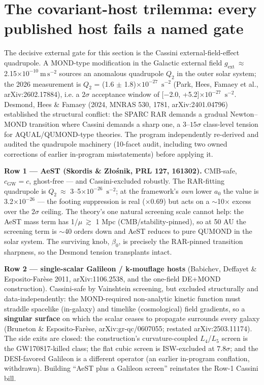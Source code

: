 \documentclass[11pt,a4paper]{article}
\begin{document}
\section{The covariant-host trilemma: every published host fails a named gate}

The decisive external gate for this section is the Cassini external-field-effect quadrupole. A MOND-type modification in the Galactic external field $g_{\mathrm{ext}}\ \approx$ 2.15$\times10^{-10}\ \mathrm{m\,s^{-2}}$ sources an anomalous quadrupole $Q_2$ in the outer solar system; the 2026 measurement is $Q_2$ = (1.6 $\pm$ 1.8)$\times10^{-27}$\ $\mathrm{s^{-2}}$ (Park, Hees, Famaey et al., arXiv:2602.17884), i.e. a $2\sigma$ acceptance window of [$-$2.0, +5.2]$\times10^{-27}$\ $\mathrm{s^{-2}}$. Desmond, Hees \& Famaey (2024, MNRAS 530, 1781, arXiv:2401.04796) established the structural conflict: the SPARC RAR demands a gradual Newton--MOND transition where Cassini demands a sharp one, a $3$--$15\sigma$ class-level tension for AQUAL/QUMOND-type theories. The program independently re-derived and audited the quadrupole machinery (10-facet audit, including two owned corrections of earlier in-program misstatements) before applying it.

\textbf{Row 1 --- AeST (Skordis \& Z\l{}o\'snik, PRL 127, 161302).} CMB-safe, $c_{\mathrm{GW}} = c$, ghost-free --- and Cassini-excluded robustly. The RAR-fitting quadrupole is $Q_2\ \approx$ 3--5$\times10^{-26}$\ $\mathrm{s^{-2}}$; at the framework's \emph{own} lower $a_{0}$ the value is 3.2$\times10^{-26}$ --- the footing suppression is real ($\times$0.69) but acts on a $\sim$10$\times$ excess over the $2\sigma$ ceiling. The theory's one natural screening scale cannot help: the AeST mass term has 1/$\mu\ \gtrsim$ 1 Mpc (CMB/stability-pinned), so at 50 AU the screening term is $\sim$40 orders down and AeST reduces to pure QUMOND in the solar system. The surviving knob, $\beta_{0}$, is precisely the RAR-pinned transition sharpness, so the Desmond tension transplants intact.

\textbf{Row 2 --- single-scalar Galileon / k-mouflage hosts} (Babichev, Deffayet \& Esposito-Far\`ese 2011, arXiv:1106.2538, and the one-field DE+MOND construction). Cassini-safe by Vainshtein screening, but excluded structurally and data-independently: the MOND-required non-analytic kinetic function must straddle spacelike (in-galaxy) and timelike (cosmological) field gradients, so a \textbf{singular surface} on which the scalar ceases to propagate surrounds every galaxy (Bruneton \& Esposito-Far\`ese, arXiv:gr-qc/0607055; restated arXiv:2503.11174). The side exits are closed: the construction's curvature-coupled $L_{4}$/$L_{5}$ screen is the GW170817-killed class; the flat cubic screen is ISW-excluded at $7.8\sigma$; and the DESI-favored Galileon is a different operator (an earlier in-program conflation, withdrawn). Building ``AeST plus a Galileon screen'' reinstates the Row-1 Cassini bill.
\end{document}
